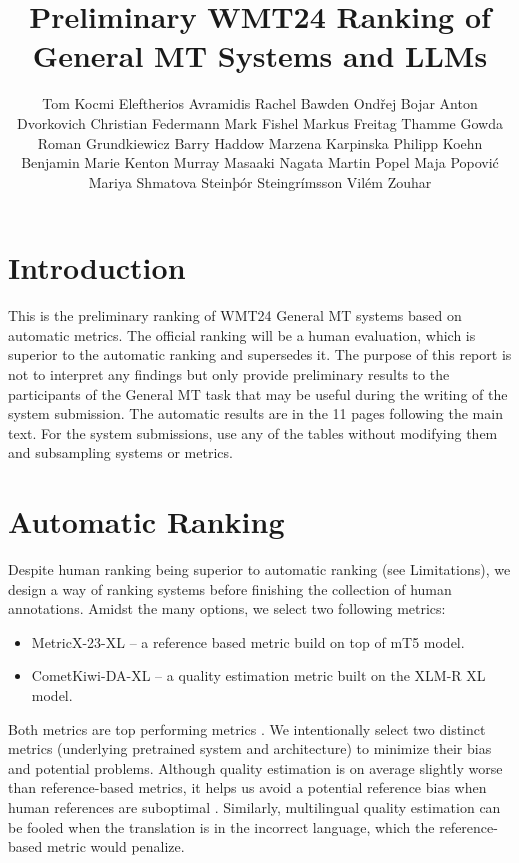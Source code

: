 \documentclass[11pt]{article}
\title{Preliminary WMT24 Ranking of General MT Systems and LLMs}
\author{
  \null \AND
  Tom Kocmi  
  \And
  Eleftherios Avramidis 
  \And
  Rachel Bawden 
  \And
  Ond\v{r}ej Bojar
  \AND
  Anton Dvorkovich 
  \And
  Christian Federmann  
  \And
  Mark Fishel  
  \And
  Markus Freitag
  \AND
  Thamme Gowda
  \And
  Roman Grundkiewicz
  \And
  Barry Haddow  
  \And
  Marzena Karpinska 
  \AND
  Philipp Koehn 
  \And
  Benjamin Marie 
  \And
  Kenton Murray 
  \And
  Masaaki Nagata
  \And
  Martin Popel 
  \AND 
  Maja Popovi\'{c}  
  \And
  Mariya Shmatova 
  \And
  Steinþór Steingrímsson 
  \And 
  Vilém Zouhar
% 
  \vspace{2cm}
}
\begin{document}
\maketitle


\section*{Introduction}

This is the preliminary ranking of WMT24 General MT systems based on automatic metrics. The official ranking will be a human evaluation, which is superior to the automatic ranking and supersedes it.
The purpose of this report is not to interpret any findings but only provide preliminary results to the participants of the General MT task that may be useful during the writing of the system submission.
The automatic results are in the 11 pages following the main text. For the system submissions, use any of the tables without modifying them and subsampling systems or metrics.

\section*{Automatic Ranking}

Despite human ranking being superior to automatic ranking (see Limitations), we design a way of ranking systems before finishing the collection of human annotations.
Amidst the many options, we select two following metrics:
\begin{itemize}[noitemsep,left=0mm]
    \item MetricX-23-XL \citep{juraska-etal-2023-metricx} -- a reference based metric build on top of mT5 model.
    \item CometKiwi-DA-XL \citep{rei-etal-2023-scaling} -- a quality estimation metric built on the XLM-R XL model.
\end{itemize}

\noindent
Both metrics are top performing metrics \citep{freitag-etal-2023-results}.
We intentionally select two distinct metrics (underlying pretrained system and architecture) to minimize their bias and potential problems.
Although quality estimation is on average slightly worse than reference-based metrics, it helps us avoid a potential reference bias when human references are suboptimal \citep{freitag-etal-2023-results}.
Similarly, multilingual quality estimation can be fooled when the translation is in the incorrect language, which the reference-based metric would penalize.
\end{document}
